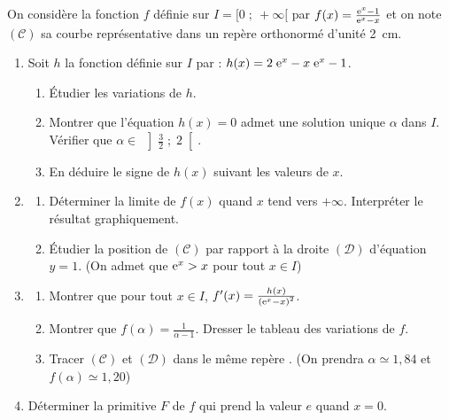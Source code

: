 \begin{exo}
On consid\`ere la fonction $f$ d\'efinie sur $I = [ 0 \; ; \ + \infty[$ par $f(x) = \frac{\mathrm{e}^{x} - 1}{\mathrm{e}^{x} - x}$
et on note $(\mathscr{C})$ sa courbe repr\'esentative dans un rep\`ere orthonorm\'e
\Oij{} d'unit\'e 2~cm.
\begin{enumerate}
\item Soit $h$ la fonction d\'efinie sur $I$ par : $h(x) = 2 \; \mathrm{e}^{x} - x \; \mathrm{e}^{x} - 1$.
      \begin{enumerate}
	      \item \'Etudier les variations de $h$.
      \item Montrer que l'\'equation $h(x) = 0$ admet une solution unique $\alpha$ dans $I$. 
            V\'erifier que ${\alpha \in \; \left] \frac{3}{2} \; ; \; 2 \right[}$.
      \item En d\'eduire le signe de $h(x)$ suivant les valeurs de $x$.
      \end{enumerate}
\item \begin{enumerate}
      \item D\'eterminer la limite de $f(x)$ quand $x$ tend vers $+\infty$.
            Interpr\'eter le r\'esultat graphiquement.
      \item \'Etudier la position de $(\mathscr{C})$ par rapport \`a la droite $(\mathcal{D})$ d'\'equation $y = 1$.
            (On admet que $\mathrm{e}^{x} > x $ pour tout $x \in I$)
      \end{enumerate}
\item \begin{enumerate}
      \item Montrer que pour tout $x \in I$, $f'(x) = \frac{h(x)}{\left(\mathrm{e}^{x} - x \right)^2}$.
      \item Montrer que $f(\alpha) = \frac{1}{\alpha - 1}$.
            Dresser le tableau des variations de $f$.
      \item Tracer $(\mathscr{C})$ et $(\mathcal{D})$ dans le m\^eme rep\`ere \Oij . 
            (On prendra $ \alpha \simeq 1,84$ et $f(\alpha) \simeq 1,20 $)
      \end{enumerate}
\item D\'eterminer la primitive $F$ de $f$ qui prend la valeur $e$ quand $x = 0$.
\end{enumerate}
\end{exo}
